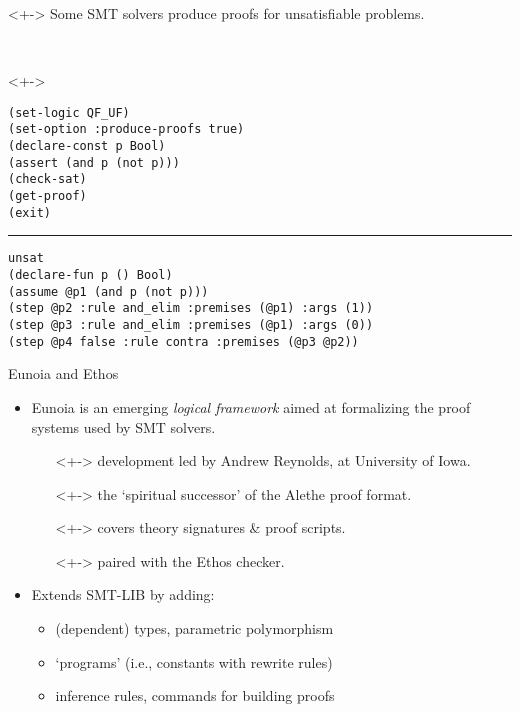 \documentclass[lualatex, 12pt, handout]{beamer}
\begin{document}
\begin{frame}[fragile]
	\begin{uncoverenv}<+->
		Some SMT solvers produce \alert{proofs} for unsatisfiable problems.
	\end{uncoverenv}
	\\[3mm]
	\begin{uncoverenv}<+->
		\exxample
		\begin{lstlisting}[basicstyle=\ttfamily\footnotesize]
(set-logic QF_UF)
(set-option :produce-proofs true)
(declare-const p Bool)
(assert (and p (not p)))
(check-sat)
(get-proof)
(exit)\end{lstlisting}
		\hrule
		\begin{lstlisting}[basicstyle=\ttfamily\footnotesize]
unsat
(declare-fun p () Bool)
(assume @p1 (and p (not p)))
(step @p2 :rule and_elim :premises (@p1) :args (1))
(step @p3 :rule and_elim :premises (@p1) :args (0))
(step @p4 false :rule contra :premises (@p3 @p2))\end{lstlisting}
	\end{uncoverenv}
\end{frame}

\begin{frame}[fragile]{Eunoia and Ethos}
	\begin{itemize}
		\item<+->
		      \alert{Eunoia} is an emerging \emph{logical framework} aimed at
		      formalizing the proof systems used by SMT solvers.
		      \begin{itemize}
			      \item[\emoji{flag-united-states}]<+-> development led by Andrew Reynolds, at University of Iowa.
			      \item[\emoji{ghost}]<+-> the `spiritual successor' of the \alert{Alethe} proof format.
			      \item[\emoji{scroll}]<+-> covers theory signatures \& proof scripts.
			      \item[\emoji{check-mark}]<+-> paired with the \alert{Ethos} checker.
		      \end{itemize}

		\item<+-> Extends SMT-LIB by adding:
		      \begin{itemize}
			      \item<+->(dependent) types, parametric polymorphism
			      \item<+->`programs' (i.e., constants with rewrite rules)
			      \item<+->inference rules, commands for building proofs
		      \end{itemize}

	\end{itemize}
\end{frame}
\end{document}
